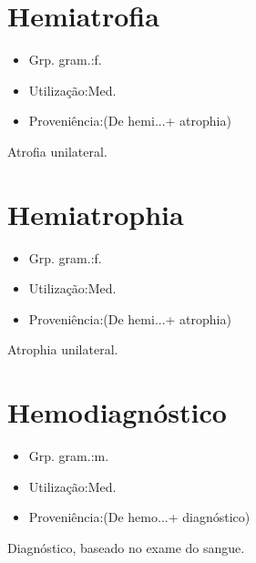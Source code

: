 \documentclass{article}
\begin{document}
\section{Hemiatrofia}
\begin{itemize}
\item {Grp. gram.:f.}
\end{itemize}
\begin{itemize}
\item {Utilização:Med.}
\end{itemize}
\begin{itemize}
\item {Proveniência:(De \textunderscore hemi...\textunderscore  + \textunderscore atrophia\textunderscore )}
\end{itemize}
Atrofia unilateral.
\section{Hemiatrophia}
\begin{itemize}
\item {Grp. gram.:f.}
\end{itemize}
\begin{itemize}
\item {Utilização:Med.}
\end{itemize}
\begin{itemize}
\item {Proveniência:(De \textunderscore hemi...\textunderscore  + \textunderscore atrophia\textunderscore )}
\end{itemize}
Atrophia unilateral.
\section{Hemodiagnóstico}
\begin{itemize}
\item {Grp. gram.:m.}
\end{itemize}
\begin{itemize}
\item {Utilização:Med.}
\end{itemize}
\begin{itemize}
\item {Proveniência:(De \textunderscore hemo...\textunderscore  + \textunderscore diagnóstico\textunderscore )}
\end{itemize}
Diagnóstico, baseado no exame do sangue.
\end{document}
